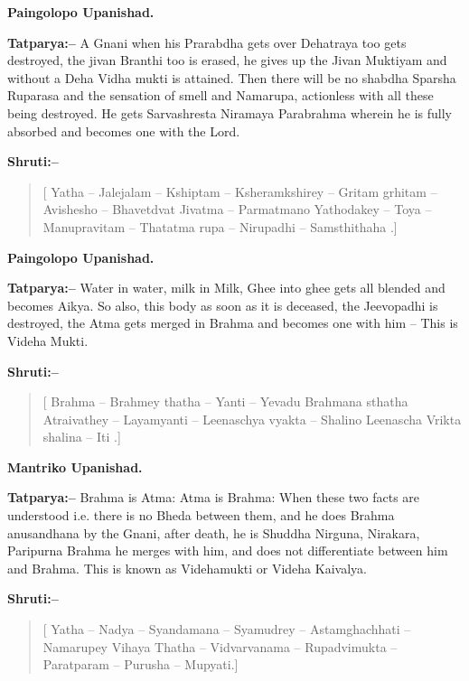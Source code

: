 \begin{flushright}
\textbf{Paingolopo Upanishad.}
\end{flushright}

\textbf{Tatparya:–} A Gnani when his Prarabdha gets over Dehatraya too gets destroyed, the jivan Branthi too is erased, he gives up the Jivan Muktiyam and without a Deha Vidha mukti is attained. Then there will be no shabdha Sparsha Ruparasa and the sensation of smell and Namarupa, actionless with all these being destroyed. He gets Sarvashresta Niramaya Parabrahma wherein he is fully absorbed and becomes one with the Lord.

\textbf{Shruti:–}

\begin{verse}
[ Yatha – Jalejalam – Kshiptam – Ksheramkshirey – Gritam grhitam – Avishesho – Bhavetdvat Jivatma – Parmatmano  Yathodakey – Toya – Manupravitam – Thatatma rupa – Nirupadhi – Samsthithaha .]
\end{verse}

\begin{flushright}
\textbf{Paingolopo Upanishad.}
\end{flushright}

\textbf{Tatparya:–} Water in water, milk in Milk, Ghee into ghee gets all blended and becomes Aikya. So also, this body as soon as it is deceased, the Jeevopadhi is destroyed, the Atma gets merged in Brahma and becomes one with him – This is Videha Mukti.

\textbf{Shruti:–}

\begin{verse}
[ Brahma – Brahmey thatha – Yanti – Yevadu Brahmana sthatha  Atraivathey – Layamyanti – Leenaschya vyakta – Shalino  Leenascha Vrikta shalina – Iti .]
\end{verse}

\begin{flushright}
\textbf{Mantriko Upanishad.}
\end{flushright}

\textbf{Tatparya:–} Brahma is Atma: Atma is Brahma: When these two facts are understood i.e. there is no Bheda between them, and he does Brahma anusandhana by the Gnani, after death, he is Shuddha Nirguna, Nirakara, Paripurna Brahma he merges with him, and does not differentiate between him and Brahma. This is known as Videhamukti or Videha Kaivalya.

\textbf{Shruti:–}

\begin{verse}
[ Yatha – Nadya – Syandamana – Syamudrey – Astamghachhati – Namarupey Vihaya  Thatha – Vidvarvanama – Rupadvimukta – Paratparam – Purusha – Mupyati.]
\end{verse}

